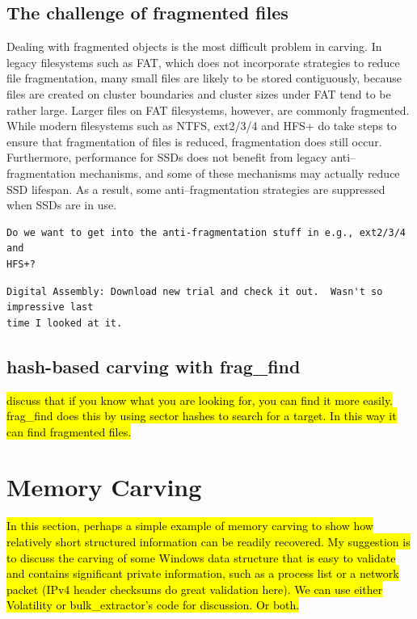 \subsection{The challenge of fragmented files}




Dealing with fragmented objects is the most difficult problem in carving.  In legacy filesystems such as FAT, which does not incorporate strategies to reduce file fragmentation, many small files are likely to be stored contiguously, because files are created on cluster boundaries and cluster sizes under FAT tend to be rather large.  Larger files on FAT filesystems, however, are commonly fragmented\cite{dfrws2007:SimsonLGarfinkel}.  While modern filesystems such as NTFS, ext2/3/4 and HFS+ do take steps to ensure that fragmentation of files is reduced, fragmentation does still occur.  Furthermore, performance for SSDs does not benefit from legacy anti--fragmentation mechanisms, and some of these mechanisms may actually reduce SSD lifespan.  As a result, some anti--fragmentation strategies are suppressed when SSDs are in use.  

\begin{Verbatim}
Do we want to get into the anti-fragmentation stuff in e.g., ext2/3/4 and 
HFS+?
\end{Verbatim}

\begin{Verbatim}
Digital Assembly: Download new trial and check it out.  Wasn't so impressive last
time I looked at it.
\end{Verbatim}

\subsection{hash-based carving with frag\_find}

\hl{discuss that if you know what you are looking for, you can find it
  more easily. frag\_find does this by using sector hashes to search
  for a target. In this way it can find fragmented files.}


\section{Memory Carving}

\hl{In this section, perhaps a simple example of memory carving to
  show how relatively short structured information can be readily
  recovered. My suggestion is to discuss the carving of some Windows
  data structure that is easy to validate and contains significant
  private information, such as a process list or a network packet
  (IPv4 header checksums do great validation here). We can use either
  Volatility or bulk\_extractor's code for discussion. Or both. }

